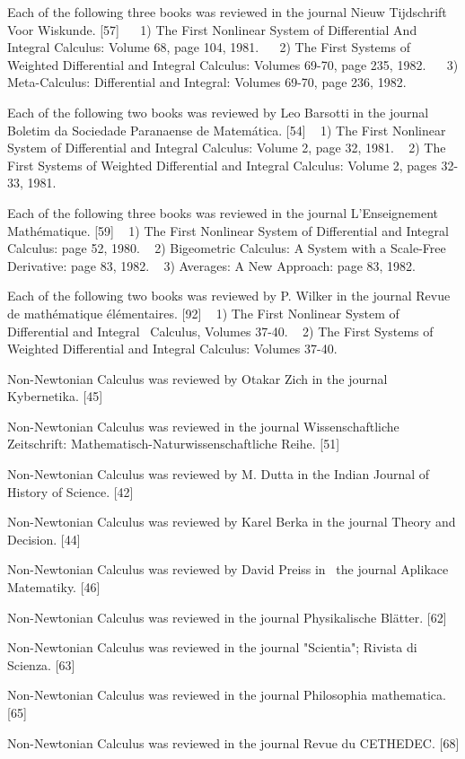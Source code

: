 \documentclass[12pt]{article}
\begin{document}
Each of the following three books was reviewed in the journal Nieuw Tijdschrift Voor Wiskunde. [57]
   1) The First Nonlinear System of Differential And Integral Calculus: Volume 68, page 104, 1981.
   2) The First Systems of Weighted Differential and Integral Calculus: Volumes 69-70, page 235, 1982.
   3) Meta-Calculus: Differential and Integral: Volumes 69-70, page 236, 1982.

Each of the following two books was reviewed by Leo Barsotti in the journal Boletim da Sociedade Paranaense de Matemática. [54]
  1) The First Nonlinear System of Differential and Integral Calculus: Volume 2, page 32, 1981.
  2) The First Systems of Weighted Differential and Integral Calculus: Volume 2, pages 32-33, 1981.

Each of the following three books was reviewed in the journal L'Enseignement Mathématique. [59]
  1) The First Nonlinear System of Differential and Integral Calculus: page 52, 1980.
  2) Bigeometric Calculus: A System with a Scale-Free Derivative: page 83, 1982.
  3) Averages: A New Approach: page 83, 1982. 

Each of the following two books was reviewed by P. Wilker in the journal Revue de mathématique élémentaires. [92]
  1) The First Nonlinear System of Differential and Integral  Calculus, Volumes 37-40.
  2) The First Systems of Weighted Differential and Integral Calculus: Volumes 37-40.

Non-Newtonian Calculus was reviewed by Otakar Zich in the journal Kybernetika. [45]

Non-Newtonian Calculus was reviewed in the journal Wissenschaftliche Zeitschrift: Mathematisch-Naturwissenschaftliche Reihe. [51]

Non-Newtonian Calculus was reviewed by M. Dutta in the Indian Journal of History of Science. [42] 

Non-Newtonian Calculus was reviewed by Karel Berka in the journal Theory and Decision. [44]

Non-Newtonian Calculus was reviewed by David Preiss in  the journal Aplikace Matematiky. [46]

Non-Newtonian Calculus was reviewed in the journal Physikalische Blätter. [62]

Non-Newtonian Calculus was reviewed in the journal "Scientia"; Rivista di Scienza. [63]

Non-Newtonian Calculus was reviewed in the journal Philosophia mathematica. [65]

Non-Newtonian Calculus was reviewed in the journal Revue du CETHEDEC. [68]
\end{document}
